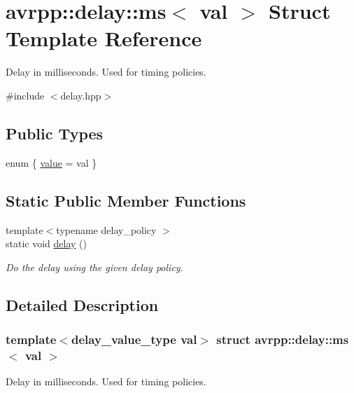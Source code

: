 \hypertarget{structavrpp_1_1delay_1_1ms}{
\section{avrpp::delay::ms$<$ val $>$ Struct Template Reference}
\label{structavrpp_1_1delay_1_1ms}
}


Delay in milliseconds. Used for timing policies.  




{\ttfamily \#include $<$delay.hpp$>$}

\subsection*{Public Types}
\begin{DoxyCompactItemize}
\item 
enum \{ \hyperlink{structavrpp_1_1delay_1_1ms_a40375e7de435a58aa71f7322407cb4e1a501091c440c77baf40f6df974168c4f2}{value} =  val
 \}
\end{DoxyCompactItemize}
\subsection*{Static Public Member Functions}
\begin{DoxyCompactItemize}
\item 
{\footnotesize template$<$typename delay\_\-policy $>$ }\\static void \hyperlink{structavrpp_1_1delay_1_1ms_ab5df6c5af2285a557ae071b93859fd48}{delay} ()
\begin{DoxyCompactList}\small\item\em Do the delay using the given delay policy. \item\end{DoxyCompactList}\end{DoxyCompactItemize}


\subsection{Detailed Description}
\subsubsection*{template$<$delay\_\-value\_\-type val$>$ struct avrpp::delay::ms$<$ val $>$}

Delay in milliseconds. Used for timing policies. 


